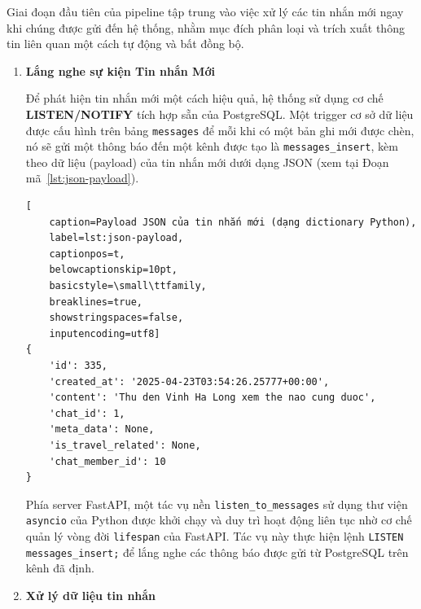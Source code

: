 Giai đoạn đầu tiên của pipeline tập trung vào việc xử lý các tin nhắn mới ngay khi chúng được gửi đến hệ thống, nhằm mục đích phân loại và trích xuất thông tin liên quan một cách tự động và bất đồng bộ.
\begin{enumerate}
    \item  \textbf{Lắng nghe sự kiện Tin nhắn Mới}

 Để phát hiện tin nhắn mới một cách hiệu quả, hệ thống sử dụng cơ chế \textbf{LISTEN/NOTIFY} tích hợp sẵn của PostgreSQL. Một trigger cơ sở dữ liệu được cấu hình trên bảng \texttt{messages} để mỗi khi có một bản ghi mới được chèn, nó sẽ gửi một thông báo đến một kênh được tạo là \texttt{messages\_insert}, kèm theo dữ liệu (payload) của tin nhắn mới dưới dạng JSON (xem tại Đoạn mã~\ref{lst:json-payload}). %
 
 \lstset{language=json}
\begin{lstlisting}[
    caption=Payload JSON của tin nhắn mới (dạng dictionary Python),
    label=lst:json-payload,
    captionpos=t,
    belowcaptionskip=10pt,
    basicstyle=\small\ttfamily,
    breaklines=true,
    showstringspaces=false,
    inputencoding=utf8] 
{
    'id': 335,
    'created_at': '2025-04-23T03:54:26.25777+00:00',
    'content': 'Thu den Vinh Ha Long xem the nao cung duoc',
    'chat_id': 1,
    'meta_data': None,
    'is_travel_related': None,
    'chat_member_id': 10
}
\end{lstlisting}

Phía server FastAPI, một tác vụ nền \texttt{listen\_to\_messages} sử dụng thư viện \texttt{asyncio} của Python được khởi chạy và duy trì hoạt động liên tục nhờ cơ chế quản lý vòng đời \texttt{lifespan} của FastAPI. Tác vụ này thực hiện lệnh \texttt{LISTEN messages\_insert;} để lắng nghe các thông báo được gửi từ PostgreSQL trên kênh đã định. %

\item  \textbf{Xử lý dữ liệu tin nhắn}


\end{enumerate}
